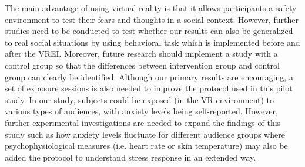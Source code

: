 \documentclass{llncs}
\begin{document}
The main advantage of using virtual reality is that it allows participants a safety environment to test their fears and thoughts in a social context. However, further studies need to be conducted to test whether our results can also be generalized to real social situations by using behavioral task which is implemented before and after the VREI. Moreover, future research should implement a study with a control group so that the differences between intervention group and control group can clearly be identified. Although our primary results are encouraging, a set of exposure sessions is also needed to improve the protocol used in this pilot study. In our study, subjects could be exposed (in the VR environment) to various types of audiences, with anxiety levels being self-reported. However, further experimental investigations are needed to expand the findings of this study such as how anxiety levels fluctuate for different audience groups where psychophysiological measures (i.e. heart rate or skin temperature) may also be added the protocol to understand stress response in an extended way. 






\end{document}
